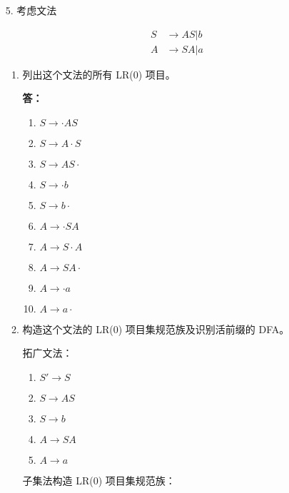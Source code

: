 \begin{enumerate}
    \item[5.] 考虑文法
    
    \begin{align*}
        S & \to AS | b \\
        A & \to SA | a
    \end{align*}
    
    \begin{enumerate}
            
        \item 列出这个文法的所有 LR(0) 项目。
        
        \textbf{答：}
        
        \begin{enumerate}[(1)]
            \item $S \to \cdot AS$
            \item $S \to A \cdot S$
            \item $S \to AS \cdot$
            \item $S \to \cdot b$
            \item $S \to b \cdot$
            \item $A \to \cdot SA$
            \item $A \to S \cdot A$
            \item $A \to SA \cdot$
            \item $A \to \cdot a$
            \item $A \to a \cdot$
        \end{enumerate}
        
        \item 构造这个文法的 LR(0) 项目集规范族及识别活前缀的 DFA。
        
        拓广文法：

        \begin{enumerate}[(1)]
            \item $S' \to S$
            \item $S \to AS$
            \item $S \to b$
            \item $A \to SA$
            \item $A \to a$
        \end{enumerate}
        
        子集法构造 LR(0) 项目集规范族：
        

\end{enumerate}
\end{enumerate}
